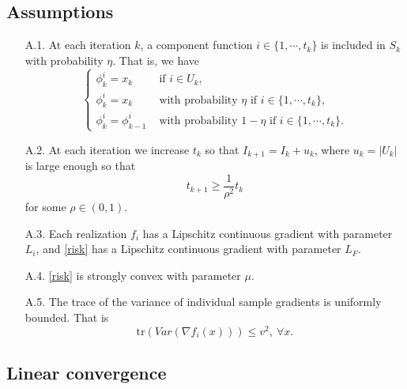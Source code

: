 \documentclass[11pt]{article}
\begin{document}
\subsection{Assumptions}\label{subsec:assume}

\begin{itemize}
 \item[A.1.] At each iteration $k$, a component function $i\in \{1,\cdots, t_k\}$ is included in $S_k$ with probability $\eta$.  That is,  we have
\[
 \begin{cases}
  \phi_{k}^i= x_k &\mbox{ if } i\in U_k, \\
  \phi_{k}^i= x_k  &\mbox{ with probability }\eta \mbox{ if } i \in \{1,\cdots,t_k\},\\
  \phi_{k}^i= \phi_{k-1}^i & \mbox{ with probability }1-\eta \mbox{ if } i \in \{1,\cdots,t_k\}.
 \end{cases}
\]

 \item[A.2.] At each iteration we increase $t_k$ so that $I_{k+1}=I_k + u_k$, where $u_k = |U_k|$ is large enough so that 
\begin{equation}   \label{Igrowth}
 t_{k+1} \geq \frac{1}{\rho^2} t_k 
 \end{equation}
 for some $\rho \in( 0,1)$.

 
 \item[A.3.] Each realization $f_i$ has a Lipschitz continuous gradient with parameter $L_i$, and \eqref{risk} has a Lipschitz continuous gradient with parameter $L_F$.  

 \item[A.4.] \eqref{risk} is strongly convex with parameter $\mu$.
 
 \item[A.5.] The trace of the variance of individual sample gradients is uniformly bounded.  That is
 \[
   \mbox{tr}(Var(\nabla f_i(x))) \leq v^2, \ \forall x.
 \]

\end{itemize}


 \bigskip

\subsection{Linear convergence}\label{subsec:converge}
\end{document}
